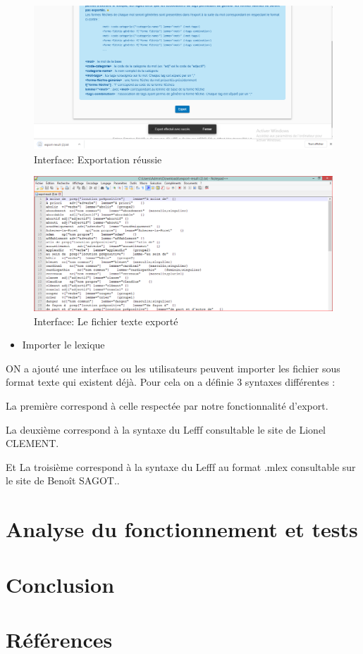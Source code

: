 \documentclass[12pt,a4paper]{article}
\begin{document}
\begin{figure}[!b]
\centering
\includegraphics{img/ExportReussi.PNG}
\caption{Interface: Exportation réussie}
\label{Tux}
\end{figure}

\begin{figure}[!b]
\centering
\includegraphics{img/ExportTxt.PNG}
\caption{Interface: Le fichier texte exporté}
\label{Tux}
\end{figure}



\begin{itemize}  
  \item Importer le lexique
\end{itemize}
ON a ajouté une interface ou les utilisateurs peuvent importer les fichier sous format texte qui existent déjà. Pour cela on a définie 3 syntaxes différentes : 


La  première correspond à celle respectée par notre fonctionnalité d'export.




La deuxième  correspond à la syntaxe du Lefff consultable le site de Lionel CLEMENT.



Et La troisième  correspond à la syntaxe du Lefff au format .mlex consultable sur le site de Benoît SAGOT..

						


\section{Analyse du fonctionnement et tests}

\section{Conclusion}

\section{Références}


\end{document}
